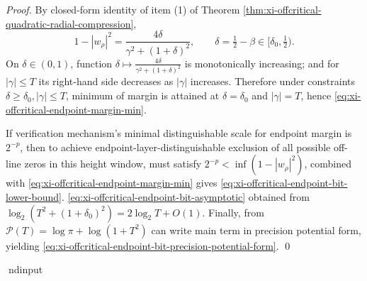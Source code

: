 \begin{proof}
By closed-form identity of item (1) of Theorem \ref{thm:xi-offcritical-quadratic-radial-compression},
\[
1-|w_\rho|^2=\frac{4\delta}{\gamma^2+(1+\delta)^2},
\qquad \delta=\tfrac12-\beta\in[\delta_0,\tfrac12).
\]
On \(\delta\in(0,1)\), function \(\delta\mapsto \frac{4\delta}{\gamma^2+(1+\delta)^2}\) is monotonically increasing; and for \(|\gamma|\le T\) its right-hand side decreases as \(|\gamma|\) increases.
Therefore under constraints \(\delta\ge\delta_0,|\gamma|\le T\), minimum of margin is attained at \(\delta=\delta_0\) and \(|\gamma|=T\), hence \eqref{eq:xi-offcritical-endpoint-margin-min}.
\par
If verification mechanism's minimal distinguishable scale for endpoint margin is \(2^{-p}\), then to achieve endpoint-layer-distinguishable exclusion of all possible off-line zeros in this height window, must satisfy \(2^{-p}<\inf(1-|w_\rho|^2)\), combined with \eqref{eq:xi-offcritical-endpoint-margin-min} gives \eqref{eq:xi-offcritical-endpoint-bit-lower-bound}.
\eqref{eq:xi-offcritical-endpoint-bit-asymptotic} obtained from \(\log_2(T^2+(1+\delta_0)^2)=2\log_2 T+O(1)\).
Finally, from \(\mathcal{P}(T)=\log\pi+\log(1+T^2)\) can write main term in precision potential form, yielding \eqref{eq:xi-offcritical-endpoint-bit-precision-potential-form}. \qed
\end{proof}


ndinput
